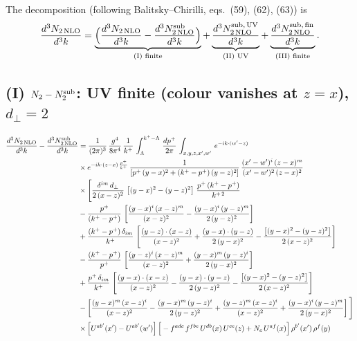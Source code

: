 \documentclass[10pt]{article}
\begin{document}
\noindent The decomposition (following Balitsky--Chirilli, eqs.~(59), (62), (63)) is
\begin{equation}
\frac{d^{3}N_{2\,\rm NLO}}{d^{3}k}=\underbrace{\Big(\frac{d^{3}N_{2\,\rm NLO}}{d^{3}k}-\frac{d^{3}N^{\rm sub}_{2\,\rm NLO}}{d^{3}k}\Big)}_{\text{(I) finite}}
+\underbrace{\frac{d^{3}N^{\rm sub,\,UV}_{2\,\rm NLO}}{d^{3}k}}_{\text{(II) UV}}
+\underbrace{\frac{d^{3}N^{\rm sub,\,fin}_{2\,\rm NLO}}{d^{3}k}}_{\text{(III) finite}} .
\end{equation}

\subsection*{(I) $N_{2}-N_{2}^{\rm sub}$: UV finite (colour vanishes at $z=x$), $d_{\perp}=2$}
\begin{align}
\frac{d^{3}N_{2\,\rm NLO}}{d^{3}k}-\frac{d^{3}N^{\rm sub}_{2\,\rm NLO}}{d^{3}k}  & =  \frac{1}{(2\pi)^{3}}\, \frac{g^{4}}{8\pi^{4}}\,\frac{1}{k^{+}}\,\int_{\Lambda}^{k^{+}-\Lambda}\, \frac{dp^{+}}{2\pi} \, \int_{x,y,z,x',w'}\,e^{-ik\cdot(w'-z)}\notag\\ &\times e^{-ik\cdot (z-x)\,\frac{p^{+}}{k^{+}}}\,\frac{1}{\left[p^{+}\,(y-x)^{2}+(k^{+}-p^{+})\,(y-z)^{2}\right]}\, \frac{(x'-w')^{i}\,(z-x)^{m}}{(x'-w')^{2}\,(z-x)^{2}} \notag \\ & \times\Bigg[\frac{\delta^{im}\,d_{\perp}}{2\,(x-z)^{2}}\,\left[(y-x)^{2}-(y-z)^{2}\right]\,\frac{p^{+}\,(k^{+}-p^{+})}{k^{+\,2}}\notag\\ &-\frac{p^{+}}{(k^{+}-p^{+})}\,\left[\frac{(y-x)^{i}\,(x-z)^{m}}{(x-z)^{2}}-\frac{(y-x)^{i}\,(y-z)^{m}}{2\,(y-z)^{2}}\right]\notag \\ & +\frac{(k^{+}-p^{+})\,\delta_{im}}{k^{+}}\,\left[\frac{(y-z)\cdot (x-z)}{(x-z)^{2}}+\frac{(y-x)\cdot (y-z)}{2\,(y-x)^{2}}-\frac{\left[(y-x)^{2}-(y-z)^{2}\right]}{2\,(x-z)^{2}}\right]\notag \\ & -\frac{(k^{+}-p^{+})}{p^{+}}\,\left[\frac{(y-z)^{i}\,(x-z)^{m}}{(x-z)^{2}}+\frac{(y-x)^{m}\,(y-z)^{i}}{2\,(y-x)^{2}}\right]\notag \\ & +\frac{p^{+}\,\delta_{im}}{k^{+}}\,\left[\frac{(y-x)\cdot (x-z)}{(x-z)^{2}}-\frac{(y-x)\cdot (y-z)}{2\,(y-z)^{2}}-\frac{\left[(y-x)^{2}-(y-z)^{2}\right]}{2\,(x-z)^{2}}\right]\notag \\ &-\left[\frac{(y-x)^{m}\,(x-z)^{i}}{(x-z)^{2}}-\frac{(y-x)^{m}\,(y-z)^{i}}{2\,(y-z)^{2}}+\frac{(y-z)^{m}\,(x-z)^{i}}{(x-z)^{2}}+\frac{(y-x)^{i}\,(y-z)^{m}}{2\,(y-x)^{2}}\right]\Bigg] \notag \\ & \times\Big[U^{ab'}(x')-U^{ab'}(w')\Big]\,\Big[-f^{adc}\,f^{fbe}\,U^{db}(x)\,U^{ce}(z)+N_{c}\,U^{af}(x)\Big]\,\rho^{b'}(x')\,\rho^{f}(y)
\end{align}
\end{document}
